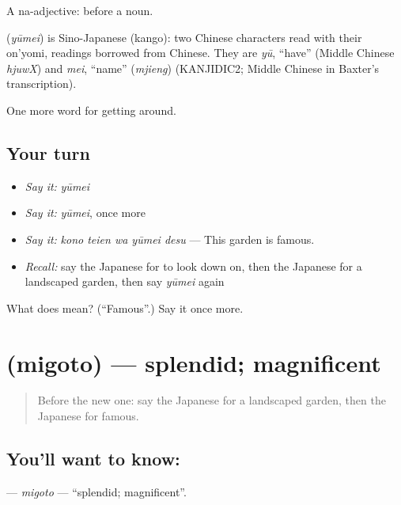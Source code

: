 A na-adjective:  before a noun.

\begin{cousinweb}
\textbf{} (\emph{yūmei}) is Sino-Japanese (kango): two Chinese characters read with their on'yomi, readings borrowed from Chinese. They are \emph{yū}, \textquotedblleft{}have\textquotedblright{} (Middle Chinese \emph{hjuwX}) and \emph{mei}, \textquotedblleft{}name\textquotedblright{} (\emph{mjieng}) (KANJIDIC2; Middle Chinese in Baxter's transcription).
\end{cousinweb}

\begin{grammarlens}[title={What you've built}]
One more word for getting around.
\end{grammarlens}

\subsection*{Your turn}
\begin{itemize}
\raggedright
  \item \emph{Say it:} \emph{yūmei}
  \item \emph{Say it:} \emph{yūmei}, once more
  \item \emph{Say it:} \emph{kono teien wa yūmei desu} — This garden is famous.
  \item \emph{Recall:} say the Japanese for to look down on, then the Japanese for a landscaped garden, then say \emph{yūmei} again
\end{itemize}

\begin{tcolorbox}[breakable,colback=teal!4,colframe=teal!35!black,title={Before you move on}]
What does  mean? (\textquotedblleft{}Famous\textquotedblright{}.) Say it once more.
\end{tcolorbox}
\section[\texorpdfstring{\ja{みごと} (migoto)}{みごと (migoto)}]{ (migoto) — splendid; magnificent}

\label{lesson:JA-C405-migoto}



\begin{quote}
Before the new one: say the Japanese for a landscaped garden, then the Japanese for famous.
\end{quote}

\subsection*{You'll want to know: }
\textbf{} — \emph{migoto} — \textquotedblleft{}splendid; magnificent\textquotedblright{}.

